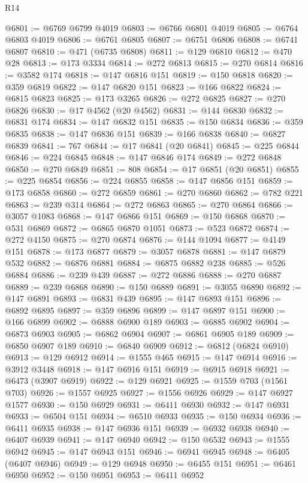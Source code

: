 \begin{lexlean}{R14}
\begin{coremodule}
@6801 := @6769 @6799 @4019
@6803 := @6766 @6801 @4019
@6805 := @6764 @6803 @4019
@6806 := @6761 @6805
@6807 := @6751 @6806
@6808 := @6741 @6807
@6810 := @471 (@6735 @6808)
@6811 := @129 @6810
@6812 := @470 @28
@6813 := @173 @3334
@6814 := @272 @6813
@6815 := @270 @6814
@6816 := @3582 @174
@6818 := @147 @6816 @151
@6819 := @150 @6818
@6820 := @359 @6819
@6822 := @147 @6820 @151
@6823 := @166 @6822
@6824 := @6815 @6823
@6825 := @173 @3265
@6826 := @272 @6825
@6827 := @270 @6826
@6830 := @17 @4562 (@20 @4562)
@6831 := @144 @6830
@6832 := @6831 @174
@6834 := @147 @6832 @151
@6835 := @150 @6834
@6836 := @359 @6835
@6838 := @147 @6836 @151
@6839 := @166 @6838
@6840 := @6827 @6839
@6841 := 767
@6844 := @17 @6841 (@20 @6841)
@6845 := @225 @6844
@6846 := @224 @6845
@6848 := @147 @6846 @174
@6849 := @272 @6848
@6850 := @270 @6849
@6851 := 808
@6854 := @17 @6851 (@20 @6851)
@6855 := @225 @6854
@6856 := @224 @6855
@6858 := @147 @6856 @151
@6859 := @173 @6858
@6860 := @272 @6859
@6861 := @270 @6860
@6862 := @782 @221
@6863 := @239 @314
@6864 := @272 @6863
@6865 := @270 @6864
@6866 := @3057 @1083
@6868 := @147 @6866 @151
@6869 := @150 @6868
@6870 := @531 @6869
@6872 := @6865 @6870 @1051
@6873 := @523 @6872
@6874 := @272 @4150
@6875 := @270 @6874
@6876 := @144 @1094
@6877 := @4149 @151
@6878 := @173 @6877
@6879 := @3057 @6878
@6881 := @147 @6879 @532
@6882 := @6876 @6881
@6884 := @6875 @6882 @238
@6885 := @526 @6884
@6886 := @239 @439
@6887 := @272 @6886
@6888 := @270 @6887
@6889 := @239 @6868
@6890 := @150 @6889
@6891 := @3055 @6890
@6892 := @147 @6891
@6893 := @6831 @439
@6895 := @147 @6893 @151
@6896 := @6892 @6895
@6897 := @359 @6896
@6899 := @147 @6897 @151
@6900 := @166 @6899
@6902 := @6888 @6900 @189
@6903 := @6885 @6902
@6904 := @6873 @6903
@6905 := @6862 @6904
@6907 := @6861 @6905 @189
@6909 := @6850 @6907 @189
@6910 := @6840 @6909
@6912 := @6812 (@6824 @6910)
@6913 := @129 @6912
@6914 := @1555 @465
@6915 := @147 @6914
@6916 := @3912 @3448
@6918 := @147 @6916 @151
@6919 := @6915 @6918
@6921 := @6473 (@3907 @6919)
@6922 := @129 @6921
@6925 := @1559 @703 (@1561 @703)
@6926 := @1557 @6925
@6927 := @1556 @6926
@6929 := @147 @6927 @1577
@6930 := @150 @6929
@6931 := @6411 @6930
@6932 := @147 @6931
@6933 := @6504 @151
@6934 := @6510 @6933
@6935 := @150 @6934
@6936 := @6411 @6935
@6938 := @147 @6936 @151
@6939 := @6932 @6938
@6940 := @6407 @6939
@6941 := @147 @6940
@6942 := @150 @6532
@6943 := @1555 @6942
@6945 := @147 @6943 @151
@6946 := @6941 @6945
@6948 := @6405 (@6407 @6946)
@6949 := @129 @6948
@6950 := @6455 @151
@6951 := @6461 @6950
@6952 := @150 @6951
@6953 := @6411 @6952

\end{coremodule}
\end{lexlean}
